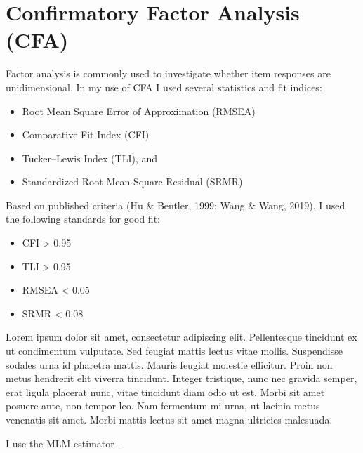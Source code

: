 \documentclass[
]{report}
\providecommand{\tightlist}{%
  \setlength{\itemsep}{0pt}\setlength{\parskip}{0pt}}
\begin{document}
\hypertarget{confirmatory-factor-analysis-cfa}{%
\section{Confirmatory Factor Analysis (CFA)}\label{confirmatory-factor-analysis-cfa}}

Factor analysis is commonly used to investigate whether item responses are unidimensional. In my use of CFA I used several statistics and fit indices:

\begin{itemize}
\tightlist
\item
  Root Mean Square Error of Approximation (RMSEA)
\item
  Comparative Fit Index (CFI)
\item
  Tucker--Lewis Index (TLI), and
\item
  Standardized Root-Mean-Square Residual (SRMR)
\end{itemize}

Based on published criteria (Hu \& Bentler, 1999; Wang \& Wang, 2019), I used the following standards for good fit:

\begin{itemize}
\tightlist
\item
  CFI \textgreater{} 0.95
\item
  TLI \textgreater{} 0.95
\item
  RMSEA \textless{} 0.05
\item
  SRMR \textless{} 0.08
\end{itemize}

Lorem ipsum dolor sit amet, consectetur adipiscing elit. Pellentesque tincidunt ex ut condimentum vulputate. Sed feugiat mattis lectus vitae mollis. Suspendisse sodales urna id pharetra mattis. Mauris feugiat molestie efficitur. Proin non metus hendrerit elit viverra tincidunt. Integer tristique, nunc nec gravida semper, erat ligula placerat nunc, vitae tincidunt diam odio ut est. Morbi sit amet posuere ante, non tempor leo. Nam fermentum mi urna, ut lacinia metus venenatis sit amet. Morbi mattis lectus sit amet magna ultricies malesuada.

I use the MLM estimator \citep{Brown2006}.
\end{document}
